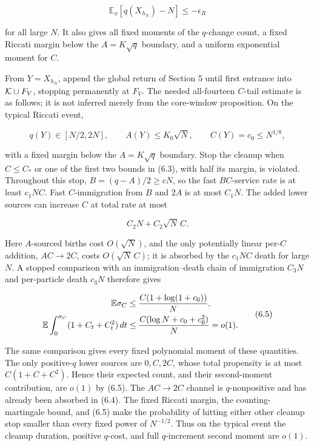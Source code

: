 \[
 \mathbb E_x[q(X_{h_N})-N]\le-\epsilon_R                 \tag{6.2}
\]

for all large \(N\). It also gives all fixed moments of the \(q\)-change
count, a fixed Riccati margin below the \(A=K\sqrt q\) boundary, and a
uniform exponential moment for \(C\).

From \(Y=X_{h_N}\), append the global return of Section 5 until first
entrance into \({\cal K}\cup F_V\), stopping permanently at \(F_V\). The
needed all-fourteen \(C\)-tail estimate is as follows; it is not
inferred merely from the core-window proposition. On the typical Riccati
event,

\[
 q(Y)\in[N/2,2N],\qquad A(Y)\le K_0\sqrt N,\qquad
 C(Y)=c_0\le N^{1/8},                                    \tag{6.3}
\]

with a fixed margin below the \(A=K\sqrt q\) boundary. Stop the cleanup
when \(C\le C_*\) or one of the first two bounds in (6.3), with half its
margin, is violated. Throughout this stop, \(B=(q-A)/2\ge cN\), so the
fast \(BC\)-service rate is at least \(c_1NC\). Fast \(C\)-immigration
from \(B\) and \(2A\) is at most \(C_1N\). The added lower sources can
increase \(C\) at total rate at most

\[
 C_2N+C_2\sqrt N\,C.                                    \tag{6.4}
\]

Here \(A\)-sourced births cost \(O(\sqrt N)\), and the only potentially
linear per-\(C\) addition, \(AC\to2C\), costs \(O(\sqrt N\,C)\); it is
absorbed by the \(c_1NC\) death for large \(N\). A stopped comparison
with an immigration--death chain of immigration \(C_3N\) and
per-particle death \(c_3N\) therefore gives

\[
 \begin{split}
 \mathbb E\sigma_C&\le {C(1+\log(1+c_0))\over N},\\
 \mathbb E\int_0^{\sigma_C}(1+C_t+C_t^2)\,dt
 &\le {C(\log N+c_0+c_0^2)\over N}=o(1).
 \end{split}                                             \tag{6.5}
\]

The same comparison gives every fixed polynomial moment of these
quantities. The only positive-\(q\) lower sources are \(0,C,2C\), whose
total propensity is at most \(C(1+C+C^2)\). Hence their expected count,
and their second-moment contribution, are \(o(1)\) by (6.5). The
\(AC\to2C\) channel is \(q\)-nonpositive and has already been absorbed
in (6.4). The fixed Riccati margin, the counting-martingale bound, and
(6.5) make the probability of hitting either other cleanup stop smaller
than every fixed power of \(N^{-1/2}\). Thus on the typical event the
cleanup duration, positive \(q\)-cost, and full \(q\)-increment second
moment are \(o(1)\).

